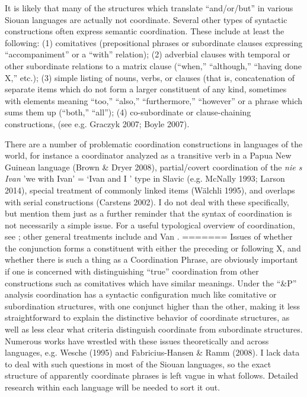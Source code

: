 \documentclass[output=paper]{LSP/langsci}
\begin{document}
It is likely that many of the structures which translate ``and/or/but'' in various Siouan languages are actually not coordinate. Several other types of syntactic constructions often express semantic coordination. These include at least the following: (1) comitatives (prepositional phrases or subordinate clauses expressing ``accompaniment'' or a ``with'' relation); (2) adverbial clauses with temporal or other subordinate relations to a matrix clause (``when,'' ``although,'' ``having done X,'' etc.); (3) simple listing of nouns, verbs, or clauses (that is, concatenation of separate items which do not form a larger constituent of any kind, sometimes with elements meaning ``too,'' ``also,'' ``furthermore,'' ``however'' or a phrase which sums them up (``both,'' ``all''); (4) co-subordinate or clause-chaining constructions, (see e.g. Graczyk 2007; Boyle 2007).

There are a number of problematic coordination constructions in languages of the world, for instance a coordinator analyzed as a transitive verb in a Papua New Guinean language (Brown \& Dryer 2008),  partial/covert coordination of the \textit{nie s Ivan} 'we with Ivan' = `Ivan and I ' type in Slavic (e.g. McNally 1993; Larson 2014), special treatment of commonly linked items (W\"alchli 1995), and overlaps with serial constructions (Carstens 2002). I do not deal with these specifically, but mention them just as a further reminder that the syntax of coordination is not necessarily a simple issue. For a useful typological overview of coordination, see \citet{Haspelmath2007}; other general treatments include \citet{Johannessen1998} and Van \citet{Oirsouw1987}. 
=======
Issues of whether the conjunction forms a constituent with either the preceding or following X, and whether there is such a thing as a Coordination Phrase, are obviously important if one is concerned with distinguishing ``true'' coordination from other constructions such as comitatives which have similar meanings. Under the ``\&P'' analysis coordination has a syntactic configuration much like comitative or subordination structures, with one conjunct higher than the other, making it less straightforward to explain the distinctive behavior of coordinate structures, as well as less clear what criteria distinguish coordinate from subordinate structures. Numerous works have wrestled with these issues theoretically and across languages, e.g. Wesche (1995) and Fabricius-Hansen \& Ramm (2008). I lack data to deal with such questions in most of the Siouan languages, so the exact structure of apparently coordinate phrases is left vague in what follows. Detailed research within each language will be needed to sort it out.
\end{document}
